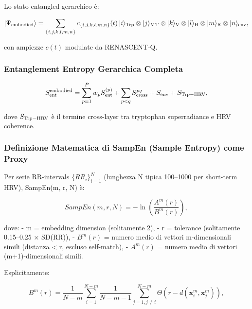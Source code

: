 \documentclass[11pt,a4paper]{article}
\theoremstyle{plain}
\theoremstyle{definition}
\begin{document}
Lo stato entangled gerarchico è:

\begin{equation}
|\Psi_{\rm embodied}\rangle = \sum_{\{i,j,k,l,m,n\}} c_{\{i,j,k,l,m,n\}}(t) \, |i\rangle_{\rm Trp} \otimes |j\rangle_{\rm MT} \otimes |k\rangle_{\rm V} \otimes |l\rangle_{\rm H} \otimes |m\rangle_{\rm R} \otimes |n\rangle_{\rm env},
\label{eq:gerarchico_ultra}
\end{equation}

con ampiezze $c(t)$ modulate da RENASCENT-Q.




\subsubsection{Entanglement Entropy Gerarchica Completa}

\begin{equation}
S_{\rm ent}^{\rm embodied} = \sum_{p=1}^P w_p S_{\rm ent}^{(p)} + \sum_{p<q} S_{\rm cross}^{pq} + S_{\rm env} + S_{\rm Trp-HRV},
\label{eq:sent_ultra}
\end{equation}

dove $S_{\rm Trp-HRV}$ è il termine cross-layer tra tryptophan superradiance e HRV coherence.


\vspace{0.3cm}

\subsubsection{Definizione Matematica di SampEn (Sample Entropy) come Proxy}

Per serie RR-intervals $\{RR_i\}_{i=1}^N$ (lunghezza N tipica 100–1000 per short-term HRV), SampEn(m, r, N) è:

\begin{equation}
SampEn(m, r, N) = -\ln \left( \frac{A^m(r)}{B^m(r)} \right),
\label{eq:sampen_def}
\end{equation}

dove:
- m = embedding dimension (solitamente 2),
- r = tolerance (solitamente 0.15–0.25 × SD(RR)),
- $B^m(r)$ = numero medio di vettori m-dimensionali simili (distanza < r, escluso self-match),
- $A^m(r)$ = numero medio di vettori (m+1)-dimensionali simili.

Esplicitamente:

\begin{equation}
B^m(r) = \frac{1}{N-m} \sum_{i=1}^{N-m} \frac{1}{N-m-1} \sum_{j=1, j\neq i}^{N-m} \Theta(r - d(\mathbf{x}_i^m, \mathbf{x}_j^m)),
\end{equation}
\end{document}
